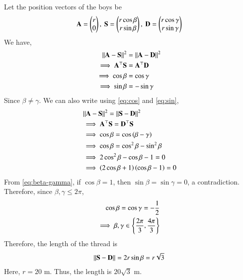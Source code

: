 \documentclass[journal,12pt,twocolumn]{IEEEtran}
\renewcommand{\vec}[1]{\boldsymbol{\mathbf{#1}}}
\begin{document}
\begin{enumerate}
    \solution Let the position vectors of the boys be
    \begin{align}
        \vec{A} = \myvec{r\\0},\ \vec{S} = \myvec{r\cos\beta\\r\sin\beta},\ \vec{D} = \myvec{r\cos\gamma\\r\sin\gamma}
        \label{eq:pos-vec-def}
    \end{align}
    We have,
    \begin{align}
        \norm{\vec{A}-\vec{S}}^2 &= \norm{\vec{A}-\vec{D}}^2 \\
        \implies \vec{A}^\top\vec{S} &= \vec{A}^\top\vec{D} \\
        \implies \cos\beta &= \cos\gamma \label{eq:cos} \\
        \implies \sin\beta &= -\sin\gamma \label{eq:sin}
    \end{align}
    Since $\beta \neq \gamma$. We can also write using \eqref{eq:cos} and
    \eqref{eq:sin},
    \begin{align}
        &\norm{\vec{A}-\vec{S}}^2 = \norm{\vec{S}-\vec{D}}^2 \\
        &\implies \vec{A}^\top\vec{S} = \vec{D}^\top\vec{S} \\
        &\implies \cos\beta = \cos\brak{\beta-\gamma} \\
        &\implies \cos\beta = \cos^2\beta - \sin^2\beta \\
        &\implies 2\cos^2\beta - \cos\beta - 1 = 0 \\
        &\implies \brak{2\cos\beta+1}\brak{\cos\beta-1} = 0
        \label{eq:beta-gamma}
    \end{align}
    From \eqref{eq:beta-gamma}, if $\cos\beta = 1$, then
    $\sin\beta = \sin\gamma = 0$, a contradiction. Therefore, since
    $\beta, \gamma \le 2\pi$,
    \begin{align}
        \cos\beta = \cos\gamma = -\frac{1}{2} \\
        \implies \beta, \gamma \in \left\{\frac{2\pi}{3},\frac{4\pi}{3}\right\}
    \end{align}
    Therefore, the length of the thread is
    \begin{align}
        \norm{\vec{S}-\vec{D}} = 2r\sin\beta = r\sqrt{3}
    \end{align}
    Here, $r = 20$ m. Thus, the length is $20\sqrt{3}$ m.


\end{enumerate}
\end{document}
